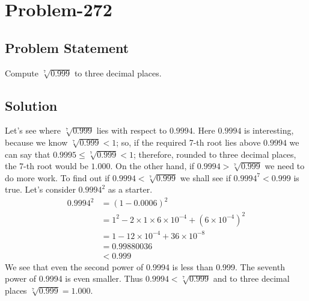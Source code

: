 \documentclass[12pt]{article}
\begin{document}
\section*{Problem-272}
\subsection*{Problem Statement}
Compute $\sqrt[7]{0.999}$ to three decimal places.

\subsection*{Solution}
Let's see where $\sqrt[7]{0.999}$ lies with respect to $0.9994$. Here $0.9994$ is interesting, because we know $\sqrt[7]{0.999} < 1$; so, if the required 7-th root lies above $0.9994$ we can say that $0.9995 \leq \sqrt[7]{0.999} < 1$; therefore, rounded to three decimal places, the 7-th root would be $1.000$. On the other hand, if $0.9994 > \sqrt[7]{0.999}$ we need to do more work. To find out if $0.9994 < \sqrt[7]{0.999}$ we shall see if $0.9994^7 < 0.999$ is true. Let's consider $0.9994^2$ as a starter.
\begin{equation*}
	\begin{aligned}
		0.9994^2 &= (1-0.0006)^2\\
		         &= 1^2 - 2 \times 1 \times 6 \times 10^{-4} + \left( 6 \times 10^{-4} \right)^2\\
		         &= 1 - 12 \times 10^{-4} + 36 \times 10^{-8}\\
		         &= 0.99880036\\
		         &< 0.999
	\end{aligned}
\end{equation*}
We see that even the second power of 0.9994 is less than 0.999. The seventh power of 0.9994 is even smaller. Thus $0.9994 < \sqrt[7]{0.999}$ and to three decimal places $\sqrt[7]{0.999} = 1.000$.
\end{document}
